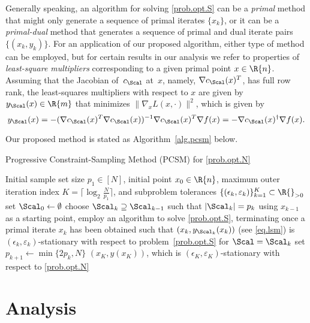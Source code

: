 Generally speaking, an algorithm for solving \eqref{prob.opt.S} can be a \emph{primal} method that might only generate a sequence of primal iterates $\{x_k\}$, or it can be a \emph{primal-dual} method that generates a sequence of primal and dual iterate pairs $\{(x_k,y_k)\}$.  For an application of our proposed algorithm, either type of method can be employed, but for certain results in our analysis we refer to properties of \emph{least-square multipliers} corresponding to a given primal point $x \in \R{n}$.  Assuming that the Jacobian of~$c_\Scal$ at~$x$, namely, $\nabla c_\Scal(x)^T$, has full row rank, the least-squares multipliers with respect to $x$ are given by $y_\Scal(x) \in \R{m}$ that minimizes $\|\nabla_x L(x,\cdot)\|^2$, which is given by
\begin{equation}\label{eq.lsm}
  y_\Scal(x) = - (\nabla c_\Scal(x)^T \nabla c_\Scal(x))^{-1} \nabla c_\Scal(x)^T \nabla f(x) = - \nabla c_\Scal(x)^\dag \nabla f(x).
\end{equation}

Our proposed method is stated as Algorithm~\ref{alg.pcsm} below.

\balgorithm
  \caption{Progressive Constraint-Sampling Method (PCSM) for \eqref{prob.opt.N}}
  \label{alg.pcsm}
  \balgorithmic[1]
    \Require Initial sample set size $p_1 \in [N]$, initial point $x_0 \in \R{n}$, maximum outer iteration index $K = \lceil \log_2 \frac{N}{p_1} \rceil$, and subproblem tolerances $\{(\epsilon_k,\varepsilon_k)\}_{k=1}^K \subset \R{}_{>0}$
    \State set $\Scal_0 \gets \emptyset$
      \State choose $\Scal_k \supseteq \Scal_{k-1}$ such that $|\Scal_k| = p_k$
      \State using $x_{k-1}$ as a starting point, employ an algorithm to solve \eqref{prob.opt.S}, terminating once a primal iterate $x_k$ has been obtained such that $(x_k,y_{\Scal_k}(x_k))$ (see \eqref{eq.lsm}) is $(\epsilon_k,\varepsilon_k)$-stationary with respect to problem~\eqref{prob.opt.S} for $\Scal = \Scal_k$
      \State set $p_{k+1} \gets \min\{2p_k, N\}$
    \EndFor
    \State \Return $(x_K,y(x_K))$, which is $(\epsilon_K,\varepsilon_K)$-stationary with respect to \eqref{prob.opt.N}
  \ealgorithmic
\ealgorithm

\section{Analysis}\label{sec.analysis}


